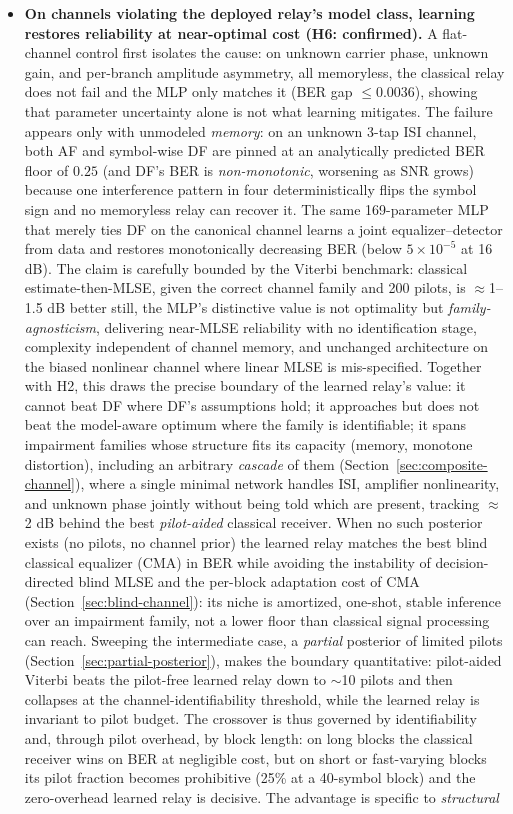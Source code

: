 \begin{itemize}
\tightlist
\item
  \textbf{On channels violating the deployed relay's model class, learning restores reliability at near-optimal cost (H6: confirmed).} A flat-channel control first isolates the cause: on unknown carrier phase, unknown gain, and per-branch amplitude asymmetry, all memoryless, the classical relay does not fail and the MLP only matches it (BER gap $\leq 0.0036$), showing that parameter uncertainty alone is not what learning mitigates. The failure appears only with unmodeled \emph{memory}: on an unknown 3-tap ISI channel, both AF and symbol-wise DF are pinned at an analytically predicted BER floor of $0.25$ (and DF's BER is \emph{non-monotonic}, worsening as SNR grows) because one interference pattern in four deterministically flips the symbol sign and no memoryless relay can recover it. The same 169-parameter MLP that merely ties DF on the canonical channel learns a joint equalizer--detector from data and restores monotonically decreasing BER (below $5\times10^{-5}$ at 16 dB). The claim is carefully bounded by the Viterbi benchmark: classical estimate-then-MLSE, given the correct channel family and 200 pilots, is $\approx$1--1.5 dB better still, the MLP's distinctive value is not optimality but \emph{family-agnosticism}, delivering near-MLSE reliability with no identification stage, complexity independent of channel memory, and unchanged architecture on the biased nonlinear channel where linear MLSE is mis-specified. Together with H2, this draws the precise boundary of the learned relay's value: it cannot beat DF where DF's assumptions hold; it approaches but does not beat the model-aware optimum where the family is identifiable; it spans impairment families whose structure fits its capacity (memory, monotone distortion), including an arbitrary \emph{cascade} of them (Section~\ref{sec:composite-channel}), where a single minimal network handles ISI, amplifier nonlinearity, and unknown phase jointly without being told which are present, tracking $\approx$2 dB behind the best \emph{pilot-aided} classical receiver. When no such posterior exists (no pilots, no channel prior) the learned relay matches the best blind classical equalizer (CMA) in BER while avoiding the instability of decision-directed blind MLSE and the per-block adaptation cost of CMA (Section~\ref{sec:blind-channel}): its niche is amortized, one-shot, stable inference over an impairment family, not a lower floor than classical signal processing can reach. Sweeping the intermediate case, a \emph{partial} posterior of limited pilots (Section~\ref{sec:partial-posterior}), makes the boundary quantitative: pilot-aided Viterbi beats the pilot-free learned relay down to $\sim$10 pilots and then collapses at the channel-identifiability threshold, while the learned relay is invariant to pilot budget. The crossover is thus governed by identifiability and, through pilot overhead, by block length: on long blocks the classical receiver wins on BER at negligible cost, but on short or fast-varying blocks its pilot fraction becomes prohibitive (25\% at a 40-symbol block) and the zero-overhead learned relay is decisive. The advantage is specific to \emph{structural} 
\end{itemize}
